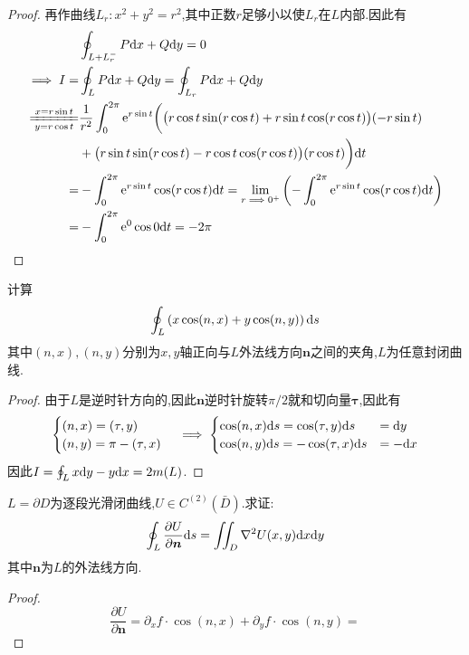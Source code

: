 \documentclass[UTF8]{book}
\begin{document}
\begin{example}
\begin{proof}
        再作曲线$L_r:x^2+y^2=r^2$,其中正数$r$足够小以使$L_r$在$L$内部.因此有
        \[\begin{aligned}
            &\oint_{L+L_r^-}P\d x+Q\d y=0\\ 
            \implies I=&\oint_L P\d x+Q\d y=\oint_{L_r} P\d x+Q\d y\\ 
            \xlongequal[y=r\cos t]{x=r\sin t}&\frac{1}{r^2}\int_0^{2\pi}\e^{r\sin t}\bigg(\big( r\cos t\sin(r\cos t)+r\sin t\cos(r\cos t) \big)(-r\sin t)\\ 
            &+\big(r\sin t\sin(r\cos t)-r\cos t\cos(r\cos t)\big)(r \cos t)\bigg)\d t\\ 
            =&-\int_0^{2\pi}\e^{r\sin t}\cos(r\cos t)\d t=\lim_{r\implies 0^+} \left( -\int_0^{2\pi}\e^{r\sin t}\cos(r\cos t)\d t \right)\\ 
            =& -\int_0^{2\pi} \e^0\cos 0\d t=-2\pi
        \end{aligned}\]
    \end{proof}
    \end{example}\begin{example}
        计算\[\oint_L \left( x\cos(n,x)+y\cos(n,y) \right) \mathrm{d} s\]
        其中$(n,x),(n,y)$分别为$x,y$轴正向与$L$外法线方向$\bm{n}$之间的夹角,$L$为任意封闭曲线.
        \begin{proof}
            由于$L$是逆时针方向的,因此$\bm{n}$逆时针旋转$\pi/2$就和切向量$\bm{\tau}$,因此有
            \[\begin{cases}
                (n,x)=(\tau,y)\\ (n,y)=\pi -(\tau,x)
            \end{cases}\implies \begin{cases}
                \cos(n,x)\mathrm{d} s=\cos(\tau,y)\mathrm{d} s&=\mathrm{d} y\\ \cos (n,y)\mathrm{d} s=-\cos(\tau,x)\mathrm{d} s&=-\mathrm{d} x
            \end{cases}\]
            因此$I=\oint_L x\mathrm{d} y-y\mathrm{d} x=2 m(L)$.
        \end{proof}
    \end{example}\begin{example}
        $L=\partial D$为逐段光滑闭曲线,$U\in C^{(2)}(\bar{D})$.求证:\[\oint_L \frac{\partial U}{\partial \bm{n}}\mathrm{d} s=\iint_D \nabla^2 U(x,y)\mathrm{d} x\mathrm{d} y\]其中$\bm{n}$为$L$的外法线方向.
        \begin{proof}
            \[\frac{\partial U}{\partial \bm{n}}=\partial_x f\cdot \cos(n,x)+\partial_y f\cdot \cos(n,y)=\]
        \end{proof}
    \end{example}
\end{document}
